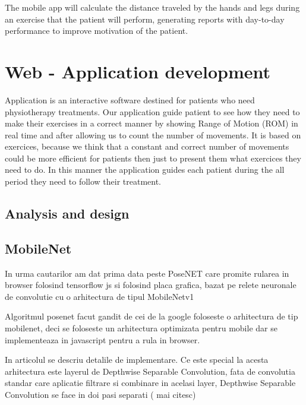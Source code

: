 The mobile app will calculate the distance traveled by the hands and legs during an exercise that the 
patient will perform, generating reports with day-to-day performance to improve motivation of the patient.

\section{Web - Application development}


Application is an interactive software destined for patients who need physiotherapy
treatments. Our application guide patient to see how they need to make their exercises in 
a correct manner by showing Range of Motion (ROM) in real time and after allowing us to 
 count the number of movements. 
It is based on exercices, because we think that a constant and correct number of movements could be more efficient for patients then just to present them what exercices they need to do. In this manner the application guides each patient during the all period they need to follow their treatment. 


\subsection{Analysis and design}

\subsection{MobileNet \cite{DBLP:journals/corr/HowardZCKWWAA17}}
 In urma cautarilor am dat prima data peste PoseNET care promite rularea in browser folosind tensorflow js si folosind placa grafica, bazat pe relete neuronale de convolutie cu o arhitectura de tipul MobileNetv1
 
 Algoritmul posenet facut gandit de cei de la google foloseste o arhitectura de tip mobilenet, 
 deci se foloseste un arhitectura optimizata pentru mobile dar se implementeaza in javascript pentru a rula in browser.
 
 In articolul  \cite{DBLP:journals/corr/HowardZCKWWAA17} se descriu detalile de implementare.
 Ce este special la acesta arhitectura este layerul de Depthwise Separable Convolution, fata de convolutia standar care aplicatie filtrare si combinare in acelasi layer, Depthwise Separable Convolution se face in doi pasi separati ( mai citesc)
  
